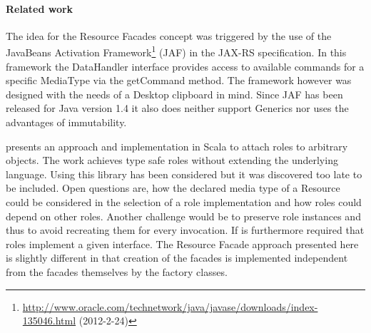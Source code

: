 \documentclass[12pt,a4paper]{scrartcl}		%
\newcommand{\citeurl}[2]{\url{#1} (#2)}
\begin{document}



\paragraph{Related work}
\label{sec:resourcefacadesrelated-work}

The idea for the Resource Facades concept was triggered by the use of the
JavaBeans Activation
Framework\footnote{\citeurl{http://www.oracle.com/technetwork/java/javase/downloads/index-135046.html}{2012-2-24}}
(JAF) in the JAX-RS specification. In this framework the DataHandler interface
provides access to available commands for a specific MediaType via the
getCommand method. The framework however was designed with the needs of a
Desktop clipboard in mind. Since JAF has been released for Java version 1.4 it
also does neither support Generics nor uses the advantages of immutability.

\cite{Pradel2008a} presents an approach and implementation in Scala to attach
roles to arbitrary objects. The work achieves type safe roles without extending
the underlying language. Using this library has been considered but it was
discovered too late to be included. Open questions are, how the declared media
type of a Resource could be considered in the selection of a role implementation
and how roles could depend on other roles. Another challenge would be to
preserve role instances and thus to avoid recreating them for every
invocation. If is furthermore required that roles implement a given
interface. The Resource Facade approach presented here is slightly different in
that creation of the facades is implemented independent from the facades
themselves by the factory classes.
\end{document}
